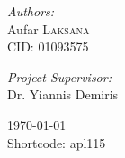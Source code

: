 \documentclass[12pt,a4paper]{report}
\begin{document}
\begin{titlepage}

\begin{flushleft}

\large \emph{Authors:} \\
Aufar \textsc{Laksana} \\
CID: 01093575\\

\addvspace{0.6em}

\large \emph{Project Supervisor:} \\
Dr. Yiannis Demiris\\

\addvspace{0.6em}


\addvspace{1.8em}

\end{flushleft}



\vspace*{3em}


{\large \today}\\[0.5cm] %


\vfill %
Shortcode: apl115 \\
\end{titlepage}

\addvspace{6em}

\renewcommand{\abstractname}{\LARGE Abstract}

\tableofcontents
\newpage

\setlength{\parindent}{0pt}
\setlength{\parskip}{10pt}
\end{document}
